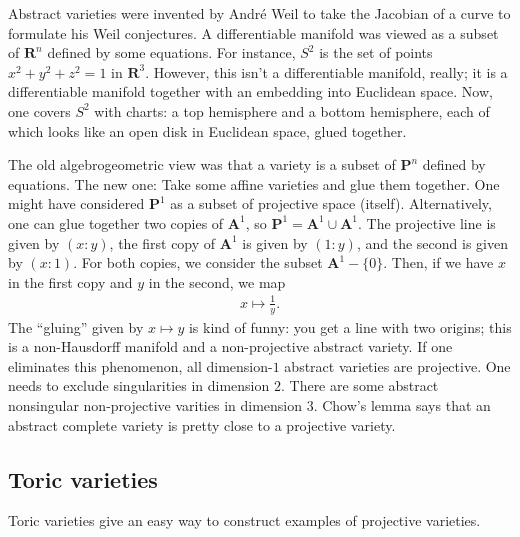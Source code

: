 \documentclass[11pt, oneside,margin=1in]{article}
\begin{document}
Abstract varieties were invented by Andr\'e Weil to take the Jacobian of a curve to formulate his Weil conjectures. A differentiable manifold was viewed as a subset of $\mathbf{R}^n$ defined by some equations. For instance, $S^2$ is the set of points $x^2+y^2+z^2=1$ in $\mathbf{R}^3$. However, this isn't a differentiable manifold, really; it is a differentiable manifold together with an embedding into Euclidean space. Now, one covers $S^2$ with charts: a top hemisphere and a bottom hemisphere, each of which looks like an open disk in Euclidean space, glued together. 

The old algebrogeometric view was that a variety is a subset of $\mathbf{P}^n$ defined by equations. The new one: Take some affine varieties and glue them together. One might have considered $\mathbf{P}^1$ as a subset of projective space (itself). Alternatively, one can glue together two copies of $\mathbf{A}^1$, so $\mathbf{P}^1=\mathbf{A}^1\cup \mathbf{A}^1$. The projective line is given by $(x:y)$, the first copy of $\mathbf{A}^1$ is given by $(1:y)$, and the second is given by $(x:1)$. For both copies, we consider the subset $\mathbf{A}^1-\{0\}$. Then, if we have $x$ in the first copy and $y$ in the second, we map 
\begin{align*}
	x\longmapsto \frac{1}{y}.
\end{align*}
The ``gluing'' given by $x\longmapsto y$ is kind of funny: you get a line with two origins; this is a non-Hausdorff manifold and a non-projective abstract variety. If one eliminates this phenomenon, all dimension-$1$ abstract varieties are projective. One needs to exclude singularities in dimension $2$. There are some abstract nonsingular non-projective varities in dimension $3$. Chow's lemma says that an abstract complete variety is pretty close to a projective variety. 

\subsection{Toric varieties}
Toric varieties give an easy way to construct examples of projective varieties.
\end{document}
